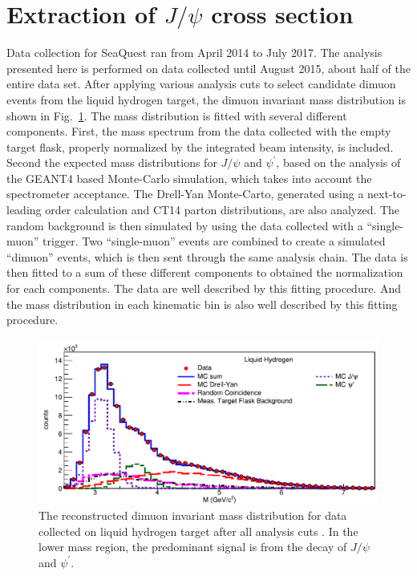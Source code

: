 \documentclass[10pt, a4paper,final]{article}
\begin{document}
\section{Extraction of \texorpdfstring{$J/\psi$}{J/psi} cross section}
\label{sec:result}
Data collection for SeaQuest ran from April 2014 to July 2017. The analysis
presented here is performed on data collected until August 2015, about half
of the entire data set. After applying various analysis cuts to select
candidate dimuon events from the liquid hydrogen target, the dimuon invariant
mass distribution is shown in Fig.~\ref{fig:mass}. The mass distribution is
fitted with several different components. First, the mass spectrum
from the data collected with the empty target flask, properly normalized by
the integrated beam intensity, is included. Second the expected mass distributions for
$J/\psi$ and $\psi^\prime$, based on the analysis of the GEANT4 based Monte-Carlo
simulation, which takes into account the spectrometer acceptance. The Drell-Yan
Monte-Carto, generated using a next-to-leading order calculation and CT14 parton
distributions, are also analyzed. The random background is then simulated by
using the data collected with a ``single-muon'' trigger. Two ``single-muon''
events are combined to create a simulated ``dimuon'' events, which is then sent
through the same analysis chain. The data is then fitted to a sum of these
different components to obtained the normalization for each components. The
data are well described by this fitting procedure. And the mass distribution
in each kinematic bin is also well described by this fitting procedure.

\begin{figure}[htbp!]
	\centering
	\includegraphics[width=0.65\linewidth]{extFig3_LH2}
	\caption{The reconstructed dimuon invariant mass distribution for data collected on
		liquid hydrogen target after all analysis cuts \cite{dove2021}.
		In the lower mass region, the predominant signal is from the decay
		of $J/\psi$ and $\psi^\prime$. }
	\label{fig:mass}
\end{figure}
\end{document}

